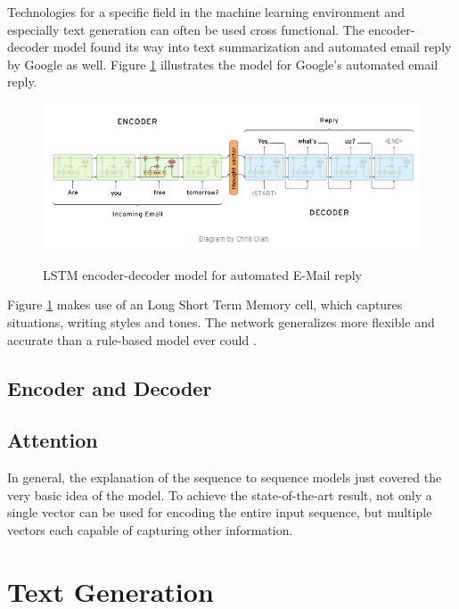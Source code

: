 Technologies for a specific field in the machine learning environment and especially text generation can often be used cross functional. The encoder-decoder model found its way into text summarization and automated email reply by Google \cite{google} as well. Figure \ref{enc-dec} illustrates the model for Google's automated email reply.

\begin{figure}
	\begin{center}
		\includegraphics[width=5.5in]{photos/encoder_decoder}\\
		\caption{LSTM encoder-decoder model for automated E-Mail reply}\label{enc-dec}
	\end{center}
\end{figure}

Figure \ref{enc-dec} makes use of an Long Short Term Memory cell, which captures situations, writing styles and tones. The network generalizes more flexible and accurate than a rule-based model ever could \cite{google}. 


\subsection{Encoder and Decoder}
\subsection{Attention}
In general, the explanation of the sequence to sequence models just covered the very basic idea of the model. To achieve the state-of-the-art result, not only a single vector can be used for encoding the entire input sequence, but multiple vectors each capable of capturing other information. 


\section{Text Generation}\label{ss:history}

